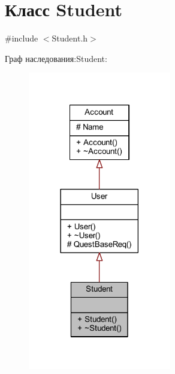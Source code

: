 \hypertarget{class_student}{}\section{Класс Student}
\label{class_student}


{\ttfamily \#include $<$Student.\+h$>$}



Граф наследования\+:Student\+:\nopagebreak
\begin{figure}[H]
\begin{center}
\leavevmode
\includegraphics[width=177pt]{d1/d6b/class_student__inherit__graph}
\end{center}
\end{figure}


